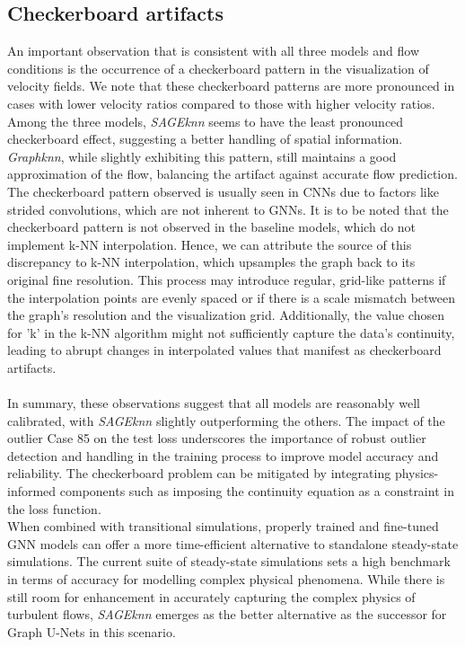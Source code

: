 \subsection{Checkerboard artifacts}
An important observation that is consistent with all three models and flow conditions is the occurrence of a checkerboard pattern in the visualization of velocity fields. We note that these checkerboard patterns are more pronounced in cases with lower velocity ratios compared to those with higher velocity ratios. Among the three models, \textit{SAGEknn} seems to have the least pronounced checkerboard effect, suggesting a better handling of spatial information. \textit{Graphknn}, while slightly exhibiting this pattern, still maintains a good approximation of the flow, balancing the artifact against accurate flow prediction.\\
The checkerboard pattern observed is usually seen in CNNs due to factors like strided convolutions, which are not inherent to GNNs. It is to be noted that the checkerboard pattern is not observed in the baseline models, which do not implement k-NN interpolation. Hence, we can attribute the source of this discrepancy to k-NN interpolation, which upsamples the graph back to its original fine resolution. This process may introduce regular, grid-like patterns if the interpolation points are evenly spaced or if there is a scale mismatch between the graph's resolution and the visualization grid. Additionally, the value chosen for 'k' in the k-NN algorithm might not sufficiently capture the data's continuity, leading to abrupt changes in interpolated values that manifest as checkerboard artifacts. \\ \\
In summary, these observations suggest that all models are reasonably well calibrated, with \textit{SAGEknn} slightly outperforming the others. The impact of the outlier Case 85 on the test loss underscores the importance of robust outlier detection and handling in the training process to improve model accuracy and reliability. The checkerboard problem can be mitigated by integrating physics-informed components such as imposing the continuity equation as a constraint in the loss function. \\
When combined with transitional simulations, properly trained and fine-tuned GNN models can offer a more time-efficient alternative to standalone steady-state simulations. The current suite of steady-state simulations sets a high benchmark in terms of accuracy for modelling complex physical phenomena. While there is still room for enhancement in accurately capturing the complex physics of turbulent flows, \textit{SAGEknn} emerges as the better alternative as the successor for Graph U-Nets in this scenario. \\
